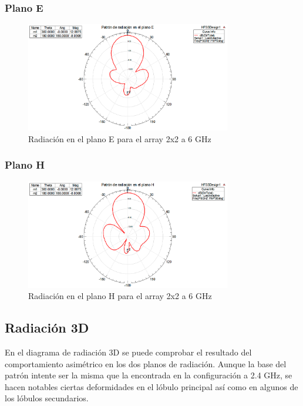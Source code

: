 \subsubsection{Plano E}
\begin{figure}[H]
    \centering
        \includegraphics[width=0.8\textwidth]{archivos/analisis/2x22/4}
        \caption{Radiación en el plano E para el array 2x2 a 6 GHz}
        \label{fig:E2x22}
\end{figure}

\subsubsection{Plano H}
\begin{figure}[H]
    \centering
        \includegraphics[width=0.8\textwidth]{archivos/analisis/2x22/5}
        \caption{Radiación en el plano H para el array 2x2 a 6 GHz}
        \label{fig:H2x22}
\end{figure}

\subsection{Radiación 3D}
\par En el diagrama de radiación 3D se puede comprobar el resultado del comportamiento asimétrico en los dos planos de radiación. Aunque la base del patrón intente ser la misma que la encontrada en la configuración a 2.4 GHz, se hacen notables ciertas deformidades en el lóbulo principal así como en algunos de los lóbulos secundarios.

